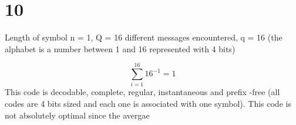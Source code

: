 \documentclass[a4paper,12pt]{article}
\begin{document}
\section*{10} 
Length of symbol n = 1, Q = 16 different messages encountered, q = 16 (the alphabet is a number between 1 and 16 represented with 4 bits)

\begin{equation}
\sum_{i=1}^{16} 16^{-1} = 1
\end{equation} 
This code is decodable, complete, regular, instantaneous and prefix -free (all codes are 4 bits sized and each one is associated with one symbol). This code is not absolutely optimal since the avergae
\end{document}
